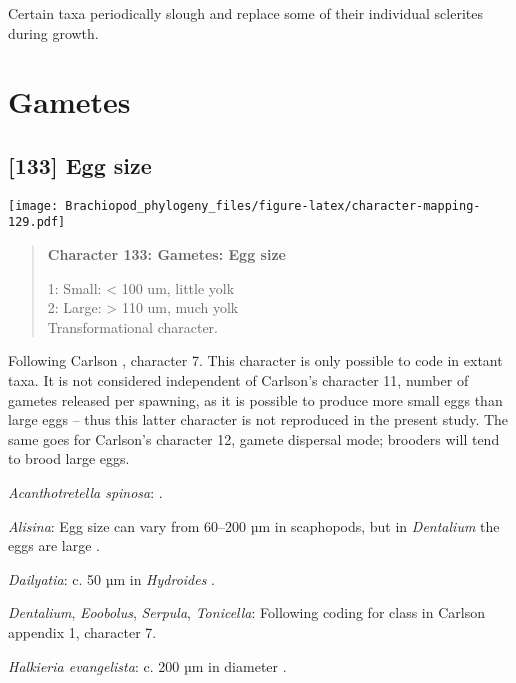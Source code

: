 \documentclass[openany]{book}
\theoremstyle{definition}
\theoremstyle{definition}
\theoremstyle{definition}
\theoremstyle{remark}
\begin{document}
Certain taxa periodically slough and replace some of their individual
sclerites during growth.

\section{Gametes}\label{gametes}

\subsection*{{[}133{]} Egg size}\label{egg-size}

\texttt{[image: Brachiopod\_phylogeny\_files/figure-latex/character-mapping-129.pdf]}

\begin{quote}
\textbf{Character 133: Gametes: Egg size}

1: Small: \textless{} 100 um, little yolk\\
2: Large: \textgreater{} 110 um, much yolk\\
Transformational character.
\end{quote}

Following Carlson \citeyearpar{Carlson1995Phylogeneticrelationships},
character 7. This character is only possible to code in extant taxa. It
is not considered independent of Carlson's character 11, number of
gametes released per spawning, as it is possible to produce more small
eggs than large eggs -- thus this latter character is not reproduced in
the present study. The same goes for Carlson's character 12, gamete
dispersal mode; brooders will tend to brood large eggs.

\hypertarget{Acanthotretella_spinosa-coding-133}{}
\emph{Acanthotretella spinosa}: \citet{BucklandNicks1988}.

\hypertarget{Alisina-coding-133}{}
\emph{Alisina}: Egg size can vary from 60--200 µm in scaphopods, but in
\emph{Dentalium} the eggs are large \citep{DufresneDube1983}.

\hypertarget{Dailyatia-coding-133}{}
\emph{Dailyatia}: c. 50 µm in \emph{Hydroides} \citep{Miles2007}.

\hypertarget{Dentalium-coding-133}{}
\emph{Dentalium}, \emph{Eoobolus}, \emph{Serpula}, \emph{Tonicella}:
Following coding for class in Carlson
\citeyearpar{Carlson1995Phylogeneticrelationships} appendix 1, character
7.

\hypertarget{Halkieria_evangelista-coding-133}{}
\emph{Halkieria evangelista}: c. 200 µm in diameter \citep{Rice1988}.
\end{document}

